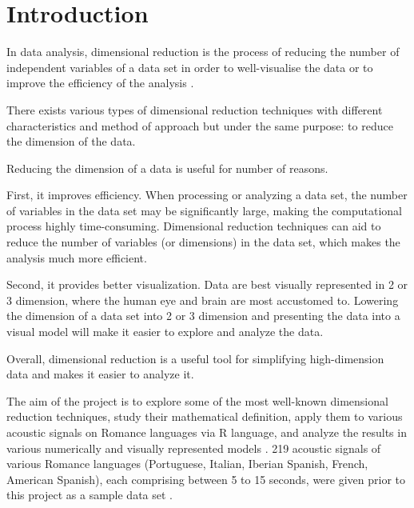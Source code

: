 \section{Introduction}
In data analysis, dimensional reduction is the process of reducing the number of independent variables of a data set in order to well-visualise the data or to improve the efficiency of the analysis \cite{Malik}. 

There exists various types of dimensional reduction techniques with different characteristics and method of approach but under the same purpose: to reduce the dimension of the data.

Reducing the dimension of a data is useful for number of reasons. 

First, it improves efficiency. When processing or analyzing a data set, the number of variables in the data set may be significantly large, making the computational process highly time-consuming. Dimensional reduction techniques can aid to reduce the number of variables (or dimensions) in the data set, which makes the analysis much more efficient.

Second, it provides better visualization. Data are best visually represented in 2 or 3 dimension, where the human eye and brain are
most accustomed to. Lowering the dimension of a data set into 2 or 3 dimension and presenting the data into a visual model will make it easier to explore and analyze the data.

Overall, dimensional reduction is a useful tool for simplifying high-dimension data and makes it easier to analyze it.

The aim of the project is to explore some of the most well-known dimensional reduction techniques, study their mathematical definition, apply them to various acoustic signals on Romance languages via R language, and analyze the results in various numerically and visually represented models \cite{R}. 219 acoustic signals of various Romance languages (Portuguese, Italian, Iberian Spanish, French, American Spanish), each comprising between 5 to 15 seconds, were given prior to this project as a sample data set \cite{Pigoli}.

